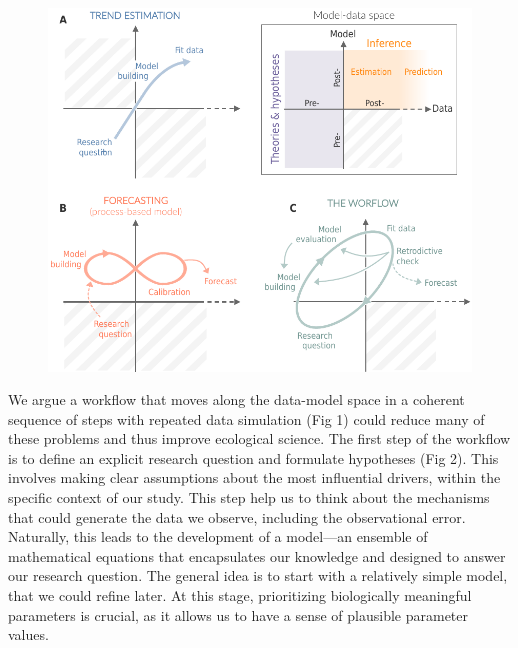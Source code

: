 \documentclass[11pt]{article}
\begin{document}
\begin{figure}[h]
	\centering
	\includegraphics{figures/modeldataspaces}
	\caption{} 
	\label{fig:modeldata}
\end{figure}

We argue a workflow that moves along the data-model space in a coherent sequence of steps with repeated data simulation (Fig 1) could reduce many of these problems and thus improve ecological science.
The first step of the workflow is to define an explicit research question and formulate hypotheses (Fig 2). This involves making clear assumptions about the most influential drivers, within the specific context of our study. This step help us to think about the mechanisms that could generate the data we observe, including the observational error. Naturally, this leads to the development of a model---an ensemble of mathematical equations that encapsulates our knowledge and designed to answer our research question. The general idea is to start with a relatively simple model, that we could refine later. At this stage, prioritizing biologically meaningful parameters is crucial, as it allows us to have a sense of plausible parameter values. 
\end{document}
